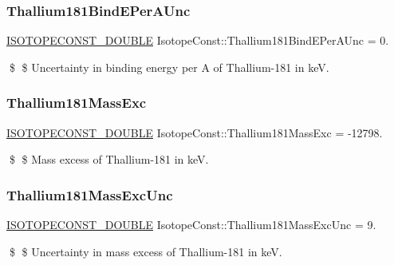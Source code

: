 \subsubsection{\texorpdfstring{Thallium181\+Bind\+E\+Per\+A\+Unc}{Thallium181BindEPerAUnc}}
{\footnotesize\ttfamily \mbox{\hyperlink{group___isotope_const-_macros_ga8f45a7272ce02c0b4c65c44636ed719a}{I\+S\+O\+T\+O\+P\+E\+C\+O\+N\+S\+T\+\_\+\+D\+O\+U\+B\+LE}} Isotope\+Const\+::\+Thallium181\+Bind\+E\+Per\+A\+Unc = 0.}

\$ \$ Uncertainty in binding energy per A of Thallium-\/181 in keV. \mbox{\label{group___isotope_const-_thallium-_tl181_gacf510de5ccfa783df7c5cde2581b1c9b}} 
\subsubsection{\texorpdfstring{Thallium181\+Mass\+Exc}{Thallium181MassExc}}
{\footnotesize\ttfamily \mbox{\hyperlink{group___isotope_const-_macros_ga8f45a7272ce02c0b4c65c44636ed719a}{I\+S\+O\+T\+O\+P\+E\+C\+O\+N\+S\+T\+\_\+\+D\+O\+U\+B\+LE}} Isotope\+Const\+::\+Thallium181\+Mass\+Exc = -\/12798.}

\$ \$ Mass excess of Thallium-\/181 in keV. \mbox{\label{group___isotope_const-_thallium-_tl181_gac35b84f4b6ce60db2254bec0284e4c09}} 
\subsubsection{\texorpdfstring{Thallium181\+Mass\+Exc\+Unc}{Thallium181MassExcUnc}}
{\footnotesize\ttfamily \mbox{\hyperlink{group___isotope_const-_macros_ga8f45a7272ce02c0b4c65c44636ed719a}{I\+S\+O\+T\+O\+P\+E\+C\+O\+N\+S\+T\+\_\+\+D\+O\+U\+B\+LE}} Isotope\+Const\+::\+Thallium181\+Mass\+Exc\+Unc = 9.}

\$ \$ Uncertainty in mass excess of Thallium-\/181 in keV. \mbox{\label{group___isotope_const-_thallium-_tl181_ga906545fab2b0a23a4a56b2df7e88f912}} 
